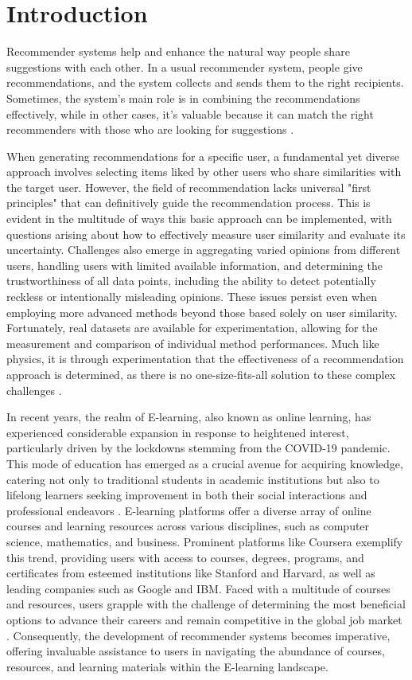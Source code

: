 \section{Introduction}
Recommender systems help and enhance the natural way people share suggestions with each other. In a usual recommender system, people give recommendations, and the system collects and sends them to the right recipients. Sometimes, the system's main role is in combining the recommendations effectively, while in other cases, it's valuable because it can match the right recommenders with those who are looking for suggestions \cite{resnick1997recommender}. 

When generating recommendations for a specific user, a fundamental yet diverse approach involves selecting items liked by other users who share similarities with the target user. However, the field of recommendation lacks universal "first principles" that can definitively guide the recommendation process. This is evident in the multitude of ways this basic approach can be implemented, with questions arising about how to effectively measure user similarity and evaluate its uncertainty. Challenges also emerge in aggregating varied opinions from different users, handling users with limited available information, and determining the trustworthiness of all data points, including the ability to detect potentially reckless or intentionally misleading opinions. These issues persist even when employing more advanced methods beyond those based solely on user similarity. Fortunately, real datasets are available for experimentation, allowing for the measurement and comparison of individual method performances. Much like physics, it is through experimentation that the effectiveness of a recommendation approach is determined, as there is no one-size-fits-all solution to these complex challenges \cite{lu2012recommender}.

In recent years, the realm of E-learning, also known as online learning, has experienced considerable expansion in response to heightened interest, particularly driven by the lockdowns stemming from the COVID-19 pandemic. This mode of education has emerged as a crucial avenue for acquiring knowledge, catering not only to traditional students in academic institutions but also to lifelong learners seeking improvement in both their social interactions and professional endeavors \cite{salehi2013hybrid}. E-learning platforms offer a diverse array of online courses and learning resources across various disciplines, such as computer science, mathematics, and business. Prominent platforms like Coursera exemplify this trend, providing users with access to courses, degrees, programs, and certificates from esteemed institutions like Stanford and Harvard, as well as leading companies such as Google and IBM. Faced with a multitude of courses and resources, users grapple with the challenge of determining the most beneficial options to advance their careers and remain competitive in the global job market \cite{castro2007applying}. Consequently, the development of recommender systems becomes imperative, offering invaluable assistance to users in navigating the abundance of courses, resources, and learning materials within the E-learning landscape.

